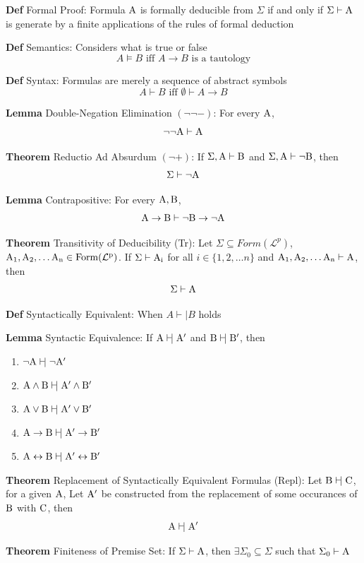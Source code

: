 \documentclass[11pt,notitlepage]{report}
\newcommand{\mc}[1]{\ensuremath{\mathcal{#1}}}
\newcommand{\tbf}[1]{\textbf{#1}}
\newcommand{\vdashv}{\mathrel{\vdash\!\rvert}}
\begin{document}
\textbf{Def} Formal Proof: Formula $\rm A$ is formally deducible from $\Sigma$ if and only if $\Sigma \vdash \rm A$ is generate by a finite applications of the rules of formal deduction

\tbf{Def} Semantics: Considers what is true or false
$$A \vDash B \text{ iff } A \to B \text{ is a tautology}$$

\tbf{Def} Syntax: Formulas are merely a sequence of abstract symbols
$$A \vdash B \text{ iff } \emptyset \vdash A \to B$$

\tbf{Lemma} Double-Negation Elimination $(\neg \neg -)$: For every $\rm A$,
$$\neg \neg \rm A \vdash \rm A$$

\tbf{Theorem} Reductio Ad Absurdum $(\neg +)$: If $\Sigma, \rm A \vdash \rm B$ and $\Sigma, \rm A \vdash \neg \rm B$, then 
$$\Sigma \vdash \neg \rm A$$

\tbf{Lemma} Contrapositive: For every $\rm A, \rm B$,
$$\rm A \to \rm B \vdash \neg \rm B \to \neg \rm A$$

\tbf{Theorem} Transitivity of Deducibility (Tr): Let $\Sigma \subseteq Form(\mc L^p)$, $\rm A_1, \rm A_2, \dots \rm A_n \in Form(\mc L^p)$. If $\Sigma \vdash \rm A_i$ for all $i \in \{1,2,\dots n\}$ and $\rm A_1, \rm A_2, \dots \rm A_n \vdash \rm A$, then
$$\Sigma \vdash \rm A$$

\tbf{Def} Syntactically Equivalent: When $A \vdashv B$ holds

\tbf{Lemma} Syntactic Equivalence: If $\rm A \vdashv A'$ and $\rm B \vdashv B'$, then
\begin{enumerate}[label=\roman*)]
    \item $\neg \rm A \vdashv \neg \rm A'$
    \item $\rm A \wedge \rm B \vdashv \rm A' \wedge \rm B'$
    \item $\rm A \vee \rm B \vdashv \rm A' \vee \rm B'$
    \item $\rm A \to \rm B \vdashv \rm A' \to \rm B'$
    \item $\rm A \leftrightarrow \rm B \vdashv \rm A' \leftrightarrow \rm B'$
\end{enumerate}

\tbf{Theorem} Replacement of Syntactically Equivalent Formulas (Repl): Let $\rm B \vdashv \rm C$, for a given $\rm A$, Let $\rm A'$ be constructed from the replacement of some occurances of $\rm B$ with $\rm C$, then
$$\rm A \vdashv \rm A'$$

\tbf{Theorem} Finiteness of Premise Set: If $\Sigma \vdash \rm A$, then $\exists \Sigma_0 \subseteq \Sigma$ such that $\Sigma_0 \vdash \rm A$
\end{document}
